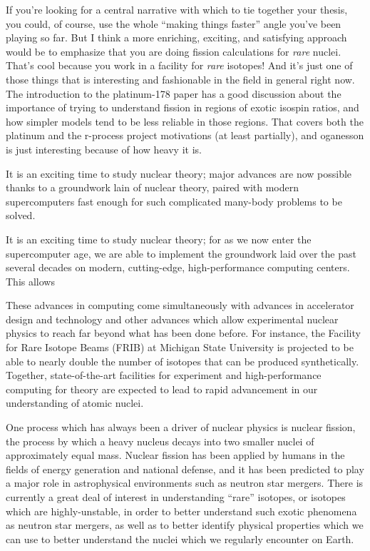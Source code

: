 If you're looking for a central narrative with which to tie together your thesis, you could, of course, use the whole ``making things faster'' angle you've been playing so far. But I think a more enriching, exciting, and satisfying approach would be to emphasize that you are doing fission calculations for \textit{rare} nuclei. That's cool because you work in a facility for \textit{rare} isotopes! And it's just one of those things that is interesting and fashionable in the field in general right now. The introduction to the platinum-178 paper has a good discussion about the importance of trying to understand fission in regions of exotic isospin ratios, and how simpler models tend to be less reliable in those regions. That covers both the platinum and the r-process project motivations (at least partially), and oganesson is just interesting because of how heavy it is.

It is an exciting time to study nuclear theory; major advances are now possible thanks to a groundwork lain of nuclear theory, paired with modern supercomputers fast enough for such complicated many-body problems to be solved.

It is an exciting time to study nuclear theory; for as we now enter the supercomputer age, we are able to implement the groundwork laid over the past several decades on modern, cutting-edge, high-performance computing centers. This allows 

These advances in computing come simultaneously with advances in accelerator design and technology and other advances which allow experimental nuclear physics to reach far beyond what has been done before. For instance, the Facility for Rare Isotope Beams (FRIB) at Michigan State University is projected to be able to nearly double the number of isotopes that can be produced synthetically. Together, state-of-the-art facilities for experiment and high-performance computing for theory are expected to lead to rapid advancement in our understanding of atomic nuclei.

One process which has always been a driver of nuclear physics is nuclear fission, the process by which a heavy nucleus decays into two smaller nuclei of approximately equal mass. Nuclear fission has been applied by humans in the fields of energy generation and national defense, and it has been predicted to play a major role in astrophysical environments such as neutron star mergers. There is currently a great deal of interest in understanding ``rare'' isotopes, or isotopes which are highly-unstable, in order to better understand such exotic phenomena as neutron star mergers, as well as to better identify physical properties which we can use to better understand the nuclei which we regularly encounter on Earth.

